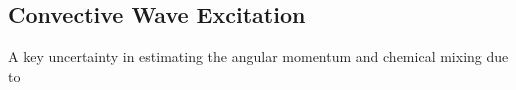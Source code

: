 {\color{purple}
\subsection{Convective Wave Excitation}
}

A key uncertainty in estimating the angular momentum and chemical mixing due to 
